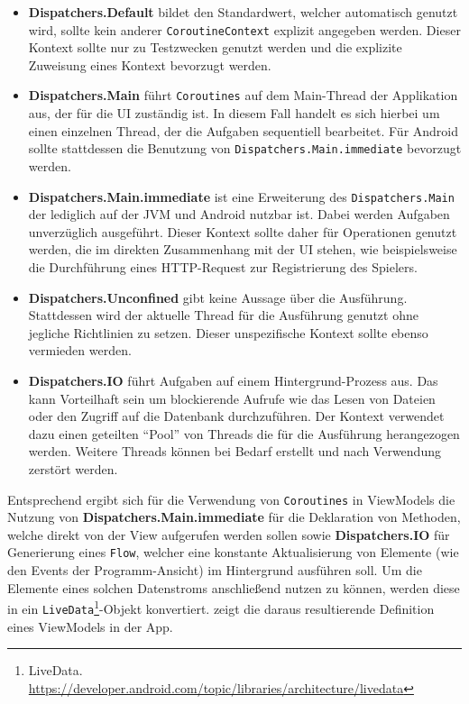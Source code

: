 \begin{itemize}
    \item \textbf{Dispatchers.Default} bildet den Standardwert, welcher automatisch genutzt wird, sollte kein anderer \texttt{CoroutineContext} explizit angegeben werden. Dieser Kontext sollte nur zu Testzwecken genutzt werden und die explizite Zuweisung eines Kontext bevorzugt werden.
    \item \textbf{Dispatchers.Main} führt \texttt{Coroutines} auf dem Main-Thread der Applikation aus, der für die UI zuständig ist. In diesem Fall handelt es sich hierbei um einen einzelnen Thread, der die Aufgaben sequentiell bearbeitet. Für Android sollte stattdessen die Benutzung von \texttt{Dispatchers.Main.immediate} bevorzugt werden.
    \item \textbf{Dispatchers.Main.immediate} ist eine Erweiterung des \texttt{Dispatchers.Main} der lediglich auf der JVM und Android nutzbar ist. Dabei werden Aufgaben unverzüglich ausgeführt. Dieser Kontext sollte daher für Operationen genutzt werden, die im direkten Zusammenhang mit der UI stehen, wie beispielsweise die Durchführung eines HTTP-Request zur Registrierung des Spielers. \newpage
    \item \textbf{Dispatchers.Unconfined} gibt keine Aussage über die Ausführung. Stattdessen wird der aktuelle Thread für die Ausführung genutzt ohne jegliche Richtlinien zu setzen. Dieser unspezifische Kontext sollte ebenso vermieden werden.
    \item \textbf{Dispatchers.IO} führt Aufgaben auf einem Hintergrund-Prozess aus. Das kann Vorteilhaft sein um blockierende Aufrufe wie das Lesen von Dateien oder den Zugriff auf die Datenbank durchzuführen. Der Kontext verwendet dazu einen geteilten \enquote{Pool} von Threads die für die Ausführung herangezogen werden. Weitere Threads können bei Bedarf erstellt und nach Verwendung zerstört werden. 
\end{itemize}

Entsprechend ergibt sich für die Verwendung von \texttt{Coroutines} in ViewModels die Nutzung von \textbf{Dispatchers.Main.immediate} für die Deklaration von Methoden, welche direkt von der View aufgerufen werden sollen sowie \textbf{Dispatchers.IO} für Generierung eines \texttt{Flow}, welcher eine konstante Aktualisierung von Elemente (wie den Events der Programm-Ansicht) im Hintergrund ausführen soll. \newline Um die Elemente eines solchen Datenstroms anschließend nutzen zu können, werden diese in ein \texttt{LiveData}\footnote{LiveData. \url{https://developer.android.com/topic/libraries/architecture/livedata}}-Objekt konvertiert.  zeigt die daraus resultierende Definition eines ViewModels in der App.

